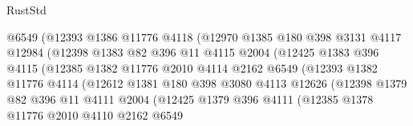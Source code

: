 \begin{lexlean}{RustStd}
\begin{coremodule}
                            @6549
                            (@12393
                              @1386
                              @11776
                              @4118
                              (@12970
                                @1385
                                @180
                                @398
                                @3131
                                @4117
                                @12984
                                (@12398
                                  @1383
                                  @82
                                  @396
                                  @11
                                  @4115
                                  @2004
                                  (@12425
                                    @1383
                                    @396
                                    @4115
                                    (@12385
                                      @1382
                                      @11776
                                      @2010
                                      @4114
                                      @2162
                                      @6549
                                      (@12393
                                        @1382
                                        @11776
                                        @4114
                                        (@12612
                                          @1381
                                          @180
                                          @398
                                          @3080
                                          @4113
                                          @12626
                                          (@12398
                                            @1379
                                            @82
                                            @396
                                            @11
                                            @4111
                                            @2004
                                            (@12425
                                              @1379
                                              @396
                                              @4111
                                              (@12385
                                                @1378
                                                @11776
                                                @2010
                                                @4110
                                                @2162
                                                @6549

\end{coremodule}
\end{lexlean}
